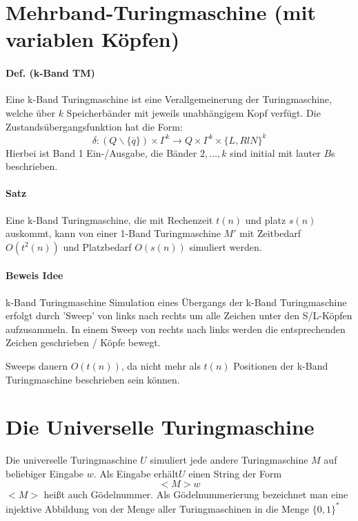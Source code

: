 \section{Mehrband-Turingmaschine (mit variablen Köpfen)}

\paragraph*{Def. (k-Band TM)} Eine k-Band Turingmaschine ist eine Verallgemeinerung der Turingmaschine, welche über $k$ Speicherbänder mit jeweils unabhängigem Kopf verfügt. Die Zustandsübergangsfunktion hat die Form: $$ \delta : (Q\backslash\{\overline{q}\}) \times \Gamma^k \rightarrow Q \times \Gamma^k \times \{L,RlN\}^k $$ Hierbei ist Band 1 Ein-/Ausgabe, die Bänder $2,\dots,k$ sind initial mit lauter $B$s beschrieben.

\paragraph*{Satz} Eine k-Band Turingmaschine, die mit Rechenzeit $t(n)$ und platz $s(n)$ auskommt, kann von einer 1-Band Turingmaschine $M'$ mit Zeitbedarf $O(t^2(n))$ und Platzbedarf $O(s(n))$ simuliert werden.

\paragraph*{Beweis Idee} k-Band Turingmaschine %
Simulation eines Übergangs der k-Band Turingmaschine erfolgt durch 'Sweep' von links nach rechts um alle Zeichen unter den S/L-Köpfen aufzusammeln. In einem Sweep von rechts nach links werden die entsprechenden Zeichen geschrieben / Köpfe bewegt.

\par\medskip
Sweeps dauern $O(t(n))$, da nicht mehr als $t(n)$ Positionen der k-Band Turingmaschine beschrieben sein können.\par\medskip

\section{Die Universelle Turingmaschine}

Die universelle Turingmaschine $U$ simuliert jede andere Turingmaschine $M$ auf beliebiger Eingabe $w$. Als Eingabe erhält$U$ einen String der Form $$<M>w$$ $<M>$ heißt auch Gödelnummer. Als Gödelnummerierung bezeichnet man eine injektive Abbildung von der Menge aller Turingmaschinen in die Menge $\{0,1\}^*$ %

